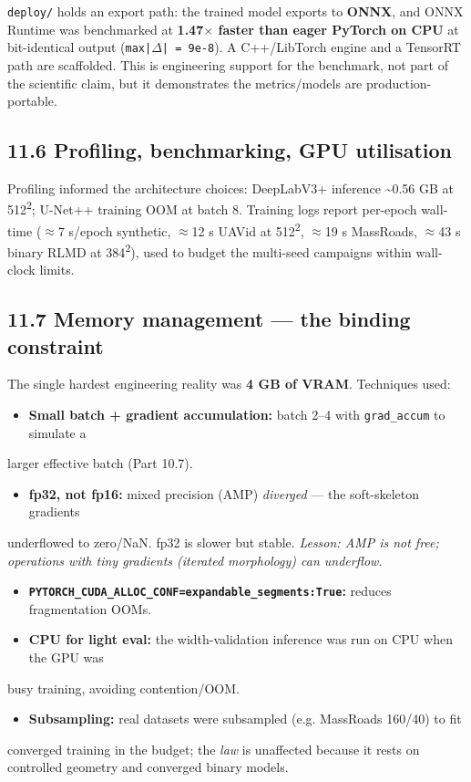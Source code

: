 \documentclass[11pt]{article}
\begin{document}
\texttt{deploy/} holds an export path: the trained model exports to \textbf{ONNX}, and ONNX Runtime was benchmarked at \textbf{1.47$\times$ faster than eager PyTorch on CPU} at bit-identical output (\texttt{max|$\Delta$| = 9e-8}). A C++/LibTorch engine and a TensorRT path are scaffolded. This is engineering support for the benchmark, not part of the scientific claim, but it demonstrates the metrics/models are production-portable.

\subsection*{11.6 Profiling, benchmarking, GPU utilisation}

Profiling informed the architecture choices: DeepLabV3+ inference \textasciitilde{}0.56 GB at 512\textsuperscript{2}; U-Net++ training OOM at batch 8. Training logs report per-epoch wall-time ($\approx$7 s/epoch synthetic, $\approx$12 s UAVid at 512\textsuperscript{2}, $\approx$19 s MassRoads, $\approx$43 s binary RLMD at 384\textsuperscript{2}), used to budget the multi-seed campaigns within wall-clock limits.

\subsection*{11.7 Memory management --- the binding constraint}

The single hardest engineering reality was \textbf{4 GB of VRAM}. Techniques used:

\begin{itemize}\setlength{\itemsep}{1pt}
\item \textbf{Small batch + gradient accumulation:} batch 2--4 with \texttt{grad\_accum} to simulate a
\end{itemize}
  larger effective batch (Part 10.7).
\begin{itemize}\setlength{\itemsep}{1pt}
\item \textbf{fp32, not fp16:} mixed precision (AMP) \textit{diverged} --- the soft-skeleton gradients
\end{itemize}
  underflowed to zero/NaN. fp32 is slower but stable. \textit{Lesson: AMP is not free;   operations with tiny gradients (iterated morphology) can underflow.}
\begin{itemize}\setlength{\itemsep}{1pt}
\item \textbf{\texttt{PYTORCH\_CUDA\_ALLOC\_CONF=expandable\_segments:True}:} reduces fragmentation OOMs.
\item \textbf{CPU for light eval:} the width-validation inference was run on CPU when the GPU was
\end{itemize}
  busy training, avoiding contention/OOM.
\begin{itemize}\setlength{\itemsep}{1pt}
\item \textbf{Subsampling:} real datasets were subsampled (e.g. MassRoads 160/40) to fit
\end{itemize}
  converged training in the budget; the \textit{law} is unaffected because it rests on   controlled geometry and converged binary models.
\end{document}
